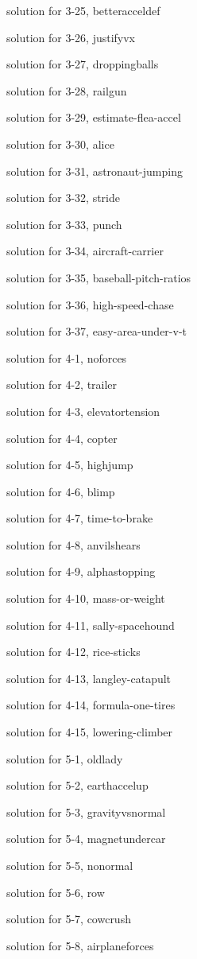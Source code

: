 \documentclass{problems}
\begin{document}
solution for 3-25, betteracceldef

solution for 3-26, justifyvx

solution for 3-27, droppingballs

solution for 3-28, railgun

solution for 3-29, estimate-flea-accel

solution for 3-30, alice

solution for 3-31, astronaut-jumping

solution for 3-32, stride

solution for 3-33, punch

solution for 3-34, aircraft-carrier

solution for 3-35, baseball-pitch-ratios

solution for 3-36, high-speed-chase

solution for 3-37, easy-area-under-v-t

solution for 4-1, noforces

solution for 4-2, trailer

solution for 4-3, elevatortension

solution for 4-4, copter

solution for 4-5, highjump

solution for 4-6, blimp

solution for 4-7, time-to-brake

solution for 4-8, anvilshears

solution for 4-9, alphastopping

solution for 4-10, mass-or-weight

solution for 4-11, sally-spacehound

solution for 4-12, rice-sticks

solution for 4-13, langley-catapult

solution for 4-14, formula-one-tires

solution for 4-15, lowering-climber

solution for 5-1, oldlady

solution for 5-2, earthaccelup

solution for 5-3, gravityvsnormal

solution for 5-4, magnetundercar

solution for 5-5, nonormal

solution for 5-6, row

solution for 5-7, cowcrush

solution for 5-8, airplaneforces
\end{document}
